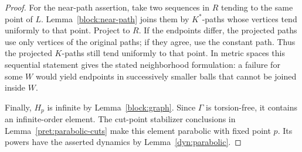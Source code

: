 \begin{proof}
For the near-path assertion, take two sequences in $R$ tending to the
same point of $L$.  Lemma~\ref{block:near-path} joins them by $K^*$-paths
whose vertices tend uniformly to that point.  Project to $R$.  If the
endpoints differ, the projected paths use only vertices of the
original paths; if they agree, use the constant path.  Thus the
projected $K$-paths still tend uniformly to that point.  In metric
spaces this sequential statement gives the stated neighborhood
formulation: a failure for some $W$ would yield endpoints in
successively smaller balls that cannot be joined inside $W$.

Finally, $H_p$ is infinite by Lemma~\ref{block:graph}.  Since $\Gamma$
is torsion-free, it contains an infinite-order element.  The
cut-point stabilizer conclusions in Lemma~\ref{pret:parabolic-cuts}
make this element parabolic with fixed point $p$.  Its powers have
the asserted dynamics by Lemma~\ref{dyn:parabolic}.
\end{proof}
